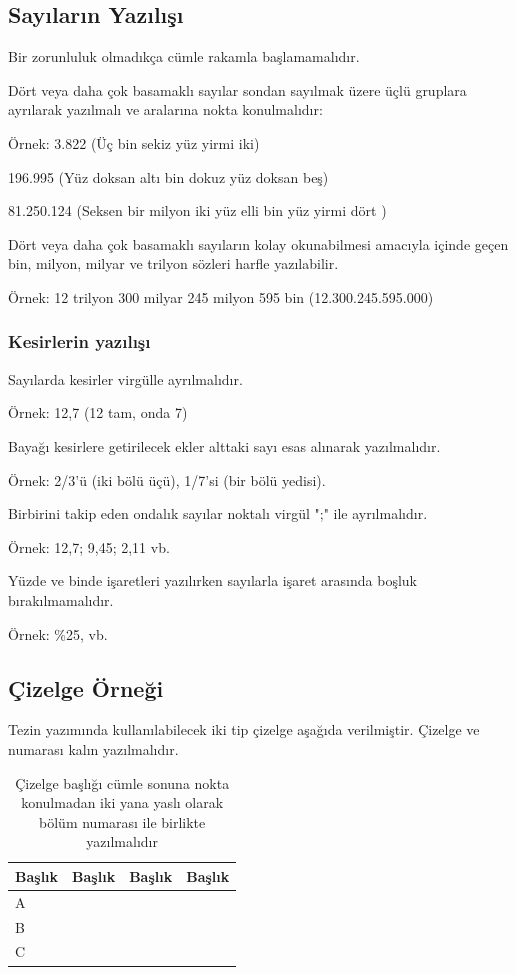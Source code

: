 \documentclass[tekyonlu,turkce,yukseklisans,karton,fenbilimleri]{tnkutez}
\begin{document}
\subsection{Sayıların Yazılışı}
Bir zorunluluk olmadıkça cümle rakamla başlamamalıdır.

Dört veya daha çok basamaklı sayılar sondan sayılmak üzere üçlü gruplara ayrılarak yazılmalı ve aralarına nokta konulmalıdır:

Örnek: 3.822 (Üç bin sekiz yüz yirmi iki)

196.995 (Yüz doksan altı bin dokuz yüz doksan beş)

81.250.124 (Seksen bir milyon iki yüz elli bin yüz yirmi dört )

Dört veya daha çok basamaklı sayıların kolay okunabilmesi amacıyla içinde geçen bin, milyon, milyar ve trilyon sözleri harfle yazılabilir.

Örnek: 12 trilyon 300 milyar 245 milyon 595 bin (12.300.245.595.000)


\subsubsection{Kesirlerin yazılışı}
Sayılarda kesirler virgülle ayrılmalıdır.

Örnek: 12,7 (12 tam, onda 7)

Bayağı kesirlere getirilecek ekler alttaki sayı esas alınarak yazılmalıdır.

Örnek: 2/3’ü (iki bölü üçü), 1/7’si (bir bölü yedisi).

Birbirini takip eden ondalık sayılar noktalı virgül ";" ile ayrılmalıdır.

Örnek: 12,7; 9,45; 2,11 vb.

Yüzde ve binde işaretleri yazılırken sayılarla işaret arasında boşluk bırakılmamalıdır.

Örnek: \%25,  vb.


\subsection{Çizelge Örneği}
Tezin yazımında kullanılabilecek iki tip çizelge aşağıda verilmiştir. Çizelge ve numarası kalın yazılmalıdır. 

\begin{table}[!t]
	\caption{Çizelge başlığı cümle sonuna nokta konulmadan iki yana yaslı olarak bölüm numarası ile birlikte yazılmalıdır}
	\begin{tabular}{L{3cm}L{3cm}L{3cm}L{3cm}}
		\hline\hline
		Başlık&Başlık&Başlık&Başlık\\\hline
		A&&&\\
		B&&&\\
		C&&&\\
		\hline\hline
	\end{tabular}
	\vspace{24pt}
\end{table}
\end{document}
